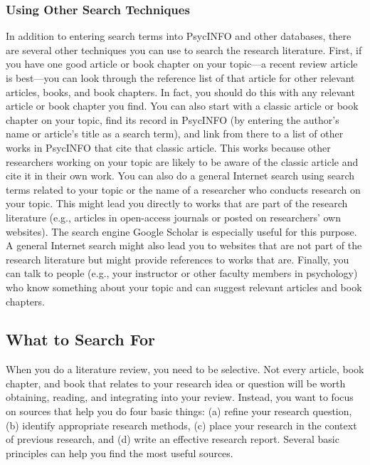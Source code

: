 \documentclass[
]{krantz}
\begin{document}
\subsubsection*{Using Other Search Techniques}\label{using-other-search-techniques}


In addition to entering search terms into PsycINFO and other databases, there are several other techniques you can use to search the research literature. First, if you have one good article or book chapter on your topic---a recent review article is best---you can look through the reference list of that article for other relevant articles, books, and book chapters. In fact, you should do this with any relevant article or book chapter you find. You can also start with a classic article or book chapter on your topic, find its record in PsycINFO (by entering the author's name or article's title as a search term), and link from there to a list of other works in PsycINFO that cite that classic article. This works because other researchers working on your topic are likely to be aware of the classic article and cite it in their own work. You can also do a general Internet search using search terms related to your topic or the name of a researcher who conducts research on your topic. This might lead you directly to works that are part of the research literature (e.g., articles in open-access journals or posted on researchers' own websites). The search engine Google Scholar is especially useful for this purpose. A general Internet search might also lead you to websites that are not part of the research literature but might provide references to works that are. Finally, you can talk to people (e.g., your instructor or other faculty members in psychology) who know something about your topic and can suggest relevant articles and book chapters.

\subsection*{What to Search For}\label{what-to-search-for}


When you do a literature review, you need to be selective. Not every article, book chapter, and book that relates to your research idea or question will be worth obtaining, reading, and integrating into your review. Instead, you want to focus on sources that help you do four basic things: (a) refine your research question, (b) identify appropriate research methods, (c) place your research in the context of previous research, and (d) write an effective research report. Several basic principles can help you find the most useful sources.
\end{document}
